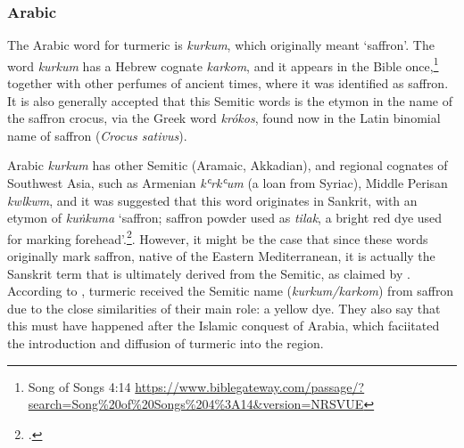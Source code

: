


\subsubsection{Arabic}


	
The Arabic word for turmeric is \textit{kurkum}, which originally meant `saffron'. The word \textit{kurkum} has a Hebrew cognate \textit{karkom}, and it appears in the Bible once,\footnote{Song of Songs 4:14 \url{https://www.biblegateway.com/passage/?search=Song\%20of\%20Songs\%204\%3A14\&version=NRSVUE}} together with other perfumes of ancient times, where it was identified as saffron. It is also generally accepted that this Semitic words is the etymon in the name of the saffron crocus, via the Greek word  \textit{krókos}, found now in the Latin binomial name of saffron (\textit{Crocus sativus}).

Arabic \textit{kurkum} has other Semitic (Aramaic, Akkadian), and regional cognates of Southwest Asia, such as Armenian  \textit{kʿrkʿum} (a loan from Syriac), Middle Perisan \textit{kwlkwm}, and it was suggested that this word originates in Sankrit, with an etymon of \textit{kuṅkuma} `saffron; saffron powder used as \textit{tilak}, a bright red dye used for marking forehead'.\footcite[164 ]{turner_comparative_1962}. However, it might be the case that since these words originally mark saffron, native of the Eastern Mediterranean, it is actually the Sanskrit term that is ultimately derived from the Semitic, as claimed by \textcite{greppin_early_1987}. 
According to \textcite[108]{amar_arabian_2017}, turmeric received the Semitic name (\textit{kurkum/karkom}) from saffron due to the close similarities of their main role: a yellow dye. They also say that this must have happened after the Islamic conquest of Arabia, which faciitated the introduction and diffusion of turmeric into the region. 

